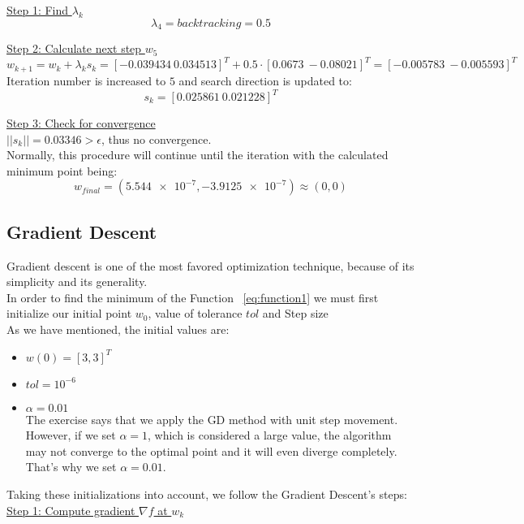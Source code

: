 \underline{Step 1: Find $\lambda_k$}
\[
\lambda_4 = \textit{backtracking} = 0.5
\]

\underline{Step 2: Calculate next step $w_{5}$}
\[
w_{k+1} = w_k + \lambda_k s_k = [-0.039434\ 0.034513]^T + 0.5 \cdot [0.0673\ -0.08021]^T = [-0.005783\ -0.005593]^T
\]
Iteration number is increased to $5$ and search direction is updated to:
\[
s_k = [0.025861\ 0.021228]^T
\]

\underline{Step 3: Check for convergence}\\[2mm]
$||s_k|| = 0.03346 > \epsilon$, thus no convergence.\\[3mm]

Normally, this procedure will continue until the  iteration with the calculated minimum point being:
\[
w_{final} = \left( \num{5.544e-7}, \num{-3.9125e-7} \right) \approx (0,0)
\]

\subsection{Gradient Descent}
Gradient descent is one of the most favored optimization technique, because of its simplicity and its generality.\\
In order to find the minimum of the Function ~\ref{eq:function1} we must first initialize our initial point $w_{0}$, value of tolerance $tol$ and Step size\\
As we have mentioned, the initial values are:
\begin{itemize}
	\item $w\left(0\right) = \left[3, 3\right]^T$
	\item $tol = 10^{-6}$
	\item $\alpha = 0.01$\\
	The exercise says that we apply the GD method with unit step movement. However, if we set $\alpha = 1$, which is considered a large value, the algorithm may not converge to the optimal point and it will even diverge completely. That's why we set $\alpha = 0.01$. 
\end{itemize} 
\vspace{2mm}

Taking these initializations into account, we follow the Gradient Descent's steps:\\

\underline{Step 1: Compute gradient $\nabla f$ at $w_{k}$}
\vspace{4mm}

